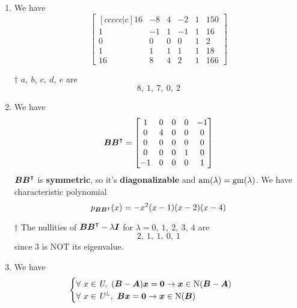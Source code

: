 \documentclass[a4paper,12pt]{article}
\begin{document}
\begin{enumerate}
	\item We have \begin{equation}
		\begin{bmatrix}[ccccc|c]
			16 & -8 & 4 & -2 & 1 & 150 \\
			1 & -1 & 1 & -1 & 1 & 16 \\
			0 & 0 & 0 & 0 & 1 & 2 \\
			1 & 1 & 1 & 1 & 1 & 18 \\
			16 & 8 & 4 & 2 & 1 & 166
		\end{bmatrix}
	\end{equation}
	\begin{answer}{$\dag$} $a, \ b, \ c, \ d, \ e$ are \begin{equation}
			8, \ 1, \ 7, \ 0, \ 2
		\end{equation}
	\end{answer}
	\item We have \begin{equation}
		\boldsymbol{BB}^\intercal = \begin{bmatrix}
			1 & 0 & 0 & 0 & -1 \\
			0 & 4 & 0 & 0 & 0 \\
			0 & 0 & 0 & 0 & 0 \\
			0 & 0 & 0 & 1 & 0 \\
			-1 & 0 & 0 & 0 & 1
		\end{bmatrix}
	\end{equation} $\boldsymbol{BB}^\intercal$ is \textbf{symmetric}, so it's \textbf{diagonalizable} and $\operatorname{am}(\lambda) = \operatorname{gm}(\lambda)$. We have characteristic polynomial \begin{equation}
		p_{\boldsymbol{BB}^\intercal}(x) = -x^2(x - 1)(x - 2)(x - 4)
	\end{equation}
	\begin{answer}{$\dag$} 
		The nullities of $\boldsymbol{BB}^\intercal - \lambda\boldsymbol{I}$ for $\lambda = 0, \ 1, \ 2, \ 3, \ 4$ are \begin{equation}
			2, \ 1, \ 1, \ 0, \ 1
		\end{equation} since $3$ is NOT its eigenvalue.
	\end{answer}
	\item We have \begin{equation}
		\begin{aligned}
			& \begin{cases}
				\forall \ x \in \textit{U}, \ (\boldsymbol{B} - \boldsymbol{A})\boldsymbol{x} = \boldsymbol{0} \rightarrow \boldsymbol{x} \in \operatorname{N}(\boldsymbol{B} - \boldsymbol{A}) \\
				\forall \ x \in \textit{U}^\perp, \ \boldsymbol{B}\boldsymbol{x} = \boldsymbol{0} \rightarrow \boldsymbol{x} \in \operatorname{N}(\boldsymbol{B})

\end{cases}
\end{aligned}
\end{equation}
\end{enumerate}
\end{document}
